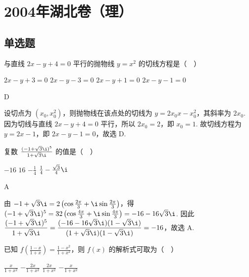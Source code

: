 \chapter{2004年湖北卷（理）}
\section{单选题}
\begin{problem}
与直线 \(2x - y + 4 = 0\) 平行的抛物线 \(y = x^2\) 的切线方程是（\(\quad\)）

\choices
    {\(2x - y + 3 = 0\)}
    {\(2x - y - 3 = 0\)}
    {\(2x - y + 1 = 0\)}
    {\(2x - y - 1 = 0\)}
\end{problem}

\begin{answer}
D
\end{answer}

\begin{solution}
设切点为 \((x_0,x_0^2)\)，则抛物线在该点处的切线为 \(y=2x_0x-x_0^2\)，其斜率为 \(2x_0\). 因为切线与直线 \(2x-y+4=0\) 平行，所以 \(2x_0=2\)，即 \(x_0=1\). 故切线方程为 \(y=2x-1\)，即 \(2x-y-1=0\)，故选 D.
\end{solution}

\begin{problem}
复数 \(\frac{(-1 + \sqrt{3}\i)^5}{1 + \sqrt{3}\i}\) 的值是（\(\quad\)）

\choices
    {\(-16\)}
    {\(16\)}
    {\(-\frac{1}{4}\)}
    {\(\frac{1}{4} - \frac{\sqrt{3}}{4}\i\)}
\end{problem}

\begin{answer}
A
\end{answer}

\begin{solution}
由 \(-1+\sqrt{3}\i=2\left(\cos\frac{2\pi}{3}+\i\sin\frac{2\pi}{3}\right)\)，得
\( (-1+\sqrt{3}\i)^5=32\left(\cos\frac{4\pi}{3}+\i\sin\frac{4\pi}{3}\right)=-16-16\sqrt{3}\i\). 因此
\(\displaystyle\frac{(-1+\sqrt{3}\i)^5}{1+\sqrt{3}\i}=\frac{(-16-16\sqrt{3}\i)(1-\sqrt{3}\i)}{(1+\sqrt{3}\i)(1-\sqrt{3}\i)}=-16\)，故选 A.
\end{solution}

\begin{problem}
已知 \( f\left(\frac{1-x}{1+x}\right)=\frac{1-x^{2}}{1+x^{2}} \)，则 \( f(x) \) 的解析式可取为（\(\quad\)）

\choices
    {\(\frac{x}{1 + x^2}\)}
    {\(-\frac{2x}{1 + x^2}\)}
    {\(\frac{2x}{1 + x^2}\)}
    {\(-\frac{x}{1 + x^2}\)}
\end{problem}

